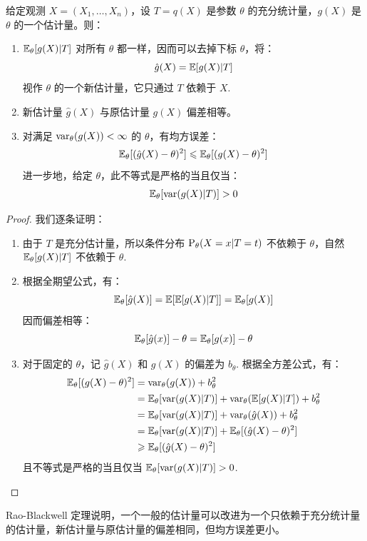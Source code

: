 \begin{theorem}
给定观测 $X=(X_1,\ldots,X_n)$，设 $T=q(X)$ 是参数 $\theta$ 的充分统计量，$g(X)$ 是 $\theta$ 的一个估计量。则：
\begin{enumerate}
    \item $\mathbb{E}_\theta[g(X)\vert T]$ 对所有 $\theta$ 都一样，因而可以去掉下标 $\theta$，将：
    \[
    \hat g(X)=\mathbb{E}[g(X)\vert T]
    \]
    视作 $\theta$ 的一个新估计量，它只通过 $T$ 依赖于 $X$.
    \item 新估计量 $\hat g(X)$ 与原估计量 $g(X)$ 偏差相等。
    \item 对满足 $\mathrm{var}_\theta(g(X))<\infty$ 的 $\theta$，有均方误差：
    \[
    \mathbb{E}_\theta[(\hat g(X)-\theta)^2]\leqslant\mathbb{E}_\theta[(g(X)-\theta)^2]
    \]
    进一步地，给定 $\theta$，此不等式是严格的当且仅当：
    \[
    \mathbb{E}_\theta[\mathrm{var}(g(X)\vert T)]>0
    \]
\end{enumerate}
\end{theorem}
\begin{proof}
我们逐条证明：
\begin{enumerate}
    \item 由于 $T$ 是充分估计量，所以条件分布 $\mathrm{P}_\theta(X=x\vert T=t)$ 不依赖于 $\theta$，自然 $\mathbb{E}_\theta[g(X)\vert T]$ 不依赖于 $\theta$.
    \item 根据全期望公式，有：
    \[
    \mathbb{E}_\theta[\hat g(X)]=\mathbb{E}[\mathbb{E}[g(X)\vert T]]=\mathbb{E}_\theta[g(X)]
    \]
    因而偏差相等：
    \[
    \mathbb{E}_\theta[\hat g(x)]-\theta=\mathbb{E}_\theta[g(x)]-\theta
    \]
    \item 对于固定的 $\theta$，记 $\hat g(X)$ 和 $g(X)$ 的偏差为 $b_\theta$. 根据全方差公式，有：
    \begin{align*}
    \mathbb{E}_\theta[(g(X)-\theta)^2]&=\mathrm{var}_\theta(g(X))+b_\theta^2\\
    &=\mathbb{E}_\theta[\mathrm{var}(g(X)\vert T)]+\mathrm{var}_\theta(\mathbb{E}[g(X)\vert T])+b_\theta^2\\
    &=\mathbb{E}_\theta[\mathrm{var}(g(X)\vert T)]+\mathrm{var}_\theta(\hat g(X))+b_\theta^2\\
    &=\mathbb{E}_\theta[\mathrm{var}(g(X)\vert T)]+\mathbb{E}_\theta[(\hat g(X)-\theta)^2]\\
    &\geqslant\mathbb{E}_\theta[(\hat g(X)-\theta)^2]
    \end{align*}
    且不等式是严格的当且仅当 $\mathbb{E}_\theta[\mathrm{var}(g(X)\vert T)]>0$.
\end{enumerate}
\end{proof}
\begin{remark}
Rao-Blackwell 定理说明，一个一般的估计量可以改进为一个只依赖于充分统计量的估计量，新估计量与原估计量的偏差相同，但均方误差更小。
\end{remark}

